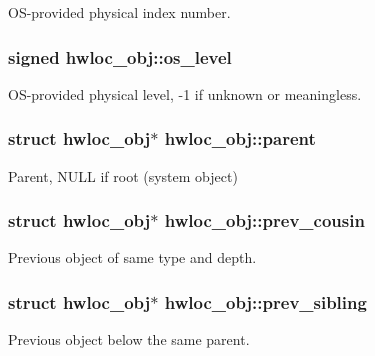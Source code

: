 OS-\/provided physical index number. 

\hypertarget{a00016_a68766f0b1c4d61b5bad87e3b81dacfde}{
\subsubsection[{os\_\-level}]{\setlength{\rightskip}{0pt plus 5cm}signed {\bf hwloc\_\-obj::os\_\-level}}}
\label{a00016_a68766f0b1c4d61b5bad87e3b81dacfde}


OS-\/provided physical level, -\/1 if unknown or meaningless. 

\hypertarget{a00016_adc494f6aed939992be1c55cca5822900}{
\subsubsection[{parent}]{\setlength{\rightskip}{0pt plus 5cm}struct {\bf hwloc\_\-obj}$\ast$ {\bf hwloc\_\-obj::parent}}}
\label{a00016_adc494f6aed939992be1c55cca5822900}


Parent, {\ttfamily NULL} if root (system object) 

\hypertarget{a00016_ac715989f55ff5a0eb6be2969ee477ec0}{
\subsubsection[{prev\_\-cousin}]{\setlength{\rightskip}{0pt plus 5cm}struct {\bf hwloc\_\-obj}$\ast$ {\bf hwloc\_\-obj::prev\_\-cousin}}}
\label{a00016_ac715989f55ff5a0eb6be2969ee477ec0}


Previous object of same type and depth. 

\hypertarget{a00016_a7b89e8c189876c0158a9282aaaf17f50}{
\subsubsection[{prev\_\-sibling}]{\setlength{\rightskip}{0pt plus 5cm}struct {\bf hwloc\_\-obj}$\ast$ {\bf hwloc\_\-obj::prev\_\-sibling}}}
\label{a00016_a7b89e8c189876c0158a9282aaaf17f50}


Previous object below the same parent. 

